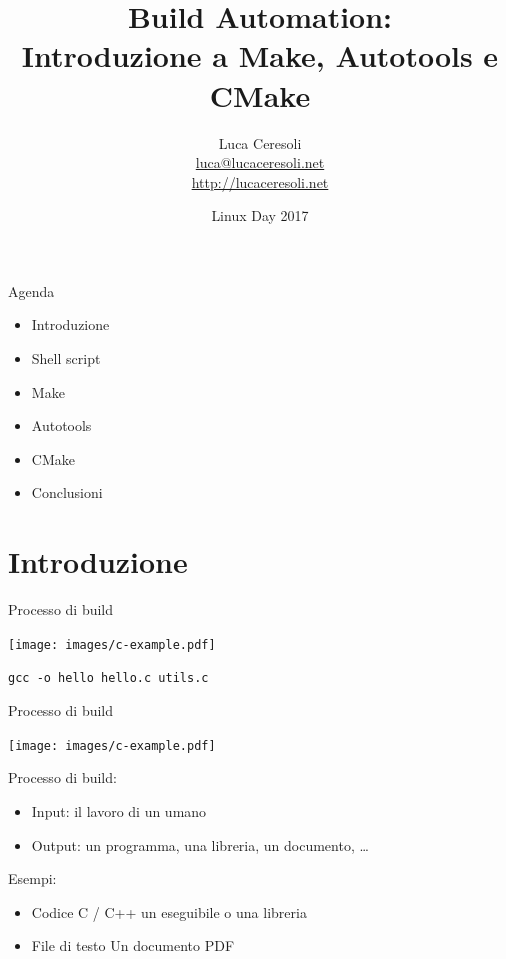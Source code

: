 \documentclass[xetex,table]{beamer}
\title{Build Automation:\\Introduzione a Make, Autotools e CMake}
\author{Luca Ceresoli\\
  \href{mailto:luca@lucaceresoli.net}{luca@lucaceresoli.net}\\
  \url{http://lucaceresoli.net}
}
\date{Linux Day 2017}
\begin{document}
\maketitle

\begin{frame}{Agenda}
  \begin{itemize}
  \item Introduzione
  \item Shell script
  \item Make
  \item Autotools
  \item CMake
  \item Conclusioni
  \end{itemize}
\end{frame}

\section{Introduzione}

\begin{frame}{Processo di build}
  \begin{center}
    \texttt{[image: images/c-example.pdf]}

    \pause
    \vspace{0.1\textheight}
    \texttt{gcc -o hello hello.c utils.c}
  \end{center}
\end{frame}

\begin{frame}{Processo di build}
  \begin{flushright}
    \texttt{[image: images/c-example.pdf]}
  \end{flushright}

  Processo di build:
  \begin{itemize}
  \item Input: il lavoro di un umano
  \item Output: un programma, una libreria, un documento, \dots
  \end{itemize}

  Esempi:
  \begin{itemize}
  \item Codice C / C++ \textrightarrow{} un eseguibile o una libreria
  \item File di testo \textrightarrow{} Un documento PDF
  \end{itemize}
\end{frame}
\end{document}
